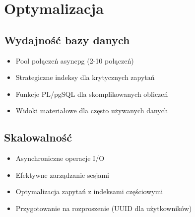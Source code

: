 \section*{Optymalizacja}

\subsection*{Wydajność bazy danych}
\begin{itemize}
    \item Pool połączeń asyncpg (2-10 połączeń)
    \item Strategiczne indeksy dla krytycznych zapytań
    \item Funkcje PL/pgSQL dla skomplikowanych obliczeń
    \item Widoki materiałowe dla często używanych danych
\end{itemize}

\subsection*{Skalowalność}
\begin{itemize}
    \item Asynchroniczne operacje I/O
    \item Efektywne zarządzanie sesjami
    \item Optymalizacja zapytań z indeksami częściowymi
    \item Przygotowanie na rozproszenie (UUID dla użytkowników)
\end{itemize}



